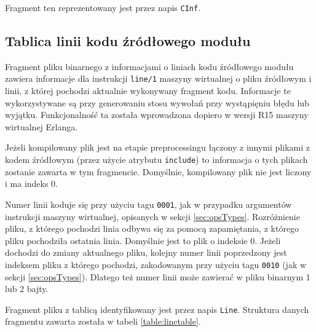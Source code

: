 Fragment ten reprezentowany jest przez napis \texttt{CInf}.

\subsection{Tablica linii kodu źródłowego modułu}
Fragment pliku binarnego z informacjami o liniach kodu źródłowego modułu zawiera informacje dla instrukcji \texttt{line/1} maszyny wirtualnej o pliku źródłowym i linii, z której pochodzi aktualnie wykonywany fragment kodu. Informacje te wykorzystywane są przy generowaniu stosu wywołań przy wystąpięniu błędu lub wyjątku. Funkcjonalność ta została wprowadzona dopiero w wersji R15 maszyny wirtualnej Erlanga.

Jeżeli kompilowany plik jest na etapie preprocessingu łączony z innymi plikami z kodem źródłowym (przez użycie atrybutu \texttt{include}) to informacja o tych plikach zostanie zawarta w tym fragmencie. Domyślnie, kompilowany plik nie jest liczony i ma indeks 0. 

Numer linii koduje się przy użyciu tagu \texttt{0001}, jak w przypadku argumentów instrukcji maszyny wirtualnej, opisanych w sekcji \ref{sec:opsTypes}.
Rozróżnienie pliku, z którego pochodzi linia odbywa się za pomocą zapamiętania, z którego pliku pochodziła ostatnia linia. Domyślnie jest to plik o indeksie 0. Jeżeli dochodzi do zmiany aktualnego pliku, kolejny numer linii poprzedzony jest indeksem pliku z którego pochodzi, zakodowanym przy użyciu tagu \texttt{0010} (jak w sekcji \ref{sec:opsTypes}). Dlatego też numer linii może zawierać w pliku binarnym 1 lub 2 bajty.

Fragment pliku z tablicą identyfikowany jest przez napis \texttt{Line}. Struktura danych fragmentu zawarta została w tabeli \ref{table:linetable}.

